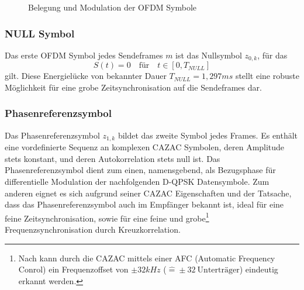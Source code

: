 \begin{figure}[htb]
\begin{center}
\end{center}
\caption{Belegung und Modulation der OFDM Symbole}
\label{chart:t_frame}
\end{figure}


\subsubsection{NULL Symbol}
Das erste OFDM Symbol jedes Sendeframes $m$ ist das Nullsymbol $z_{0,k}$, für das
\begin{equation}
S(t) = 0 \quad \text{für} \quad t \in [0, T_{NULL}]
\end{equation}
gilt. Diese Energielücke von bekannter Dauer $T_{NULL} = 1,297ms$ stellt eine robuste Möglichkeit für eine grobe Zeitsynchronisation auf die Sendeframes dar.

\subsubsection{Phasenreferenzsymbol}
\label{sec:phasenreferenzsymbol}
Das Phasenreferenzsymbol $z_{1,k}$ bildet das zweite Symbol jedes Frames. Es enthält eine vordefinierte Sequenz an komplexen \ac{CAZAC} Symbolen, deren Amplitude stets konstant, und deren Autokorrelation stets null ist. Das Phasenreferenzsymbol dient zum einen, namensgebend, als Bezugsphase für differentielle Modulation der nachfolgenden D-QPSK Datensymbole. Zum anderen eignet es sich aufgrund seiner \ac{CAZAC} Eigenschaften und der Tatsache, dass das Phasenreferenzsymbol auch im Empfänger bekannt ist, ideal für eine feine Zeitsynchronisation, sowie für eine feine und grobe\footnote{Nach \cite{dab_buch} kann durch die CAZAC mittels einer AFC (Automatic Frequency Conrol) ein Frequenzoffset von $\pm 32kHz$ ($\hat{=} \pm 32 \: \text{Unterträger}$) eindeutig erkannt werden.} Frequenzsynchronisation durch Kreuzkorrelation.

